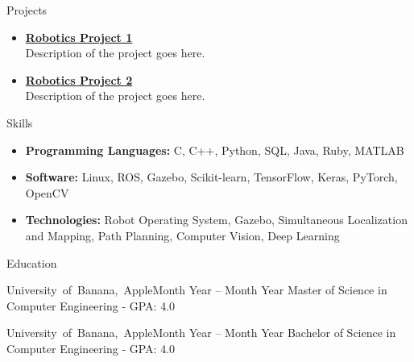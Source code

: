 \documentclass[]{mcdowellcv}
\begin{document}
\begin{cvsection}{Projects}

    \begin{cvsubsection}{}{}{}
        \begin{itemize}
            \setlength\itemsep{3pt}
            \item\textbf{\href{https://github.com/johndoe/beepboop}{Robotics Project 1}} \\
            Description of the project goes here.
        \end{itemize}
    \end{cvsubsection}
    
    \begin{cvsubsection}{}{}{}
        \begin{itemize}
            \setlength\itemsep{3pt}
            \item\textbf{\href{https://github.com/johndoe/beepboop}{Robotics Project 2}} \\
            Description of the project goes here.
        \end{itemize}
    \end{cvsubsection}
    
\end{cvsection}

\begin{cvsection}{Skills}
    \begin{cvsubsection}{}{}{}
        \begin{itemize}
            \item \textbf{Programming Languages:} C, C++, Python, SQL, Java, Ruby, MATLAB
            \item \textbf{Software:} Linux, ROS, Gazebo, Scikit-learn, TensorFlow, Keras, PyTorch, OpenCV
            \item \textbf{Technologies:} Robot Operating System, Gazebo, Simultaneous Localization and Mapping, Path Planning, Computer Vision, Deep Learning
        \end{itemize}
    \end{cvsubsection}
\end{cvsection}

\begin{cvsection}{Education}

    \begin{cvsubsection}{\mbox {University of Banana, Apple}}{}{Month Year -- Month Year}
        Master of Science in Computer Engineering - GPA: 4.0
    \end{cvsubsection}
    
    \begin{cvsubsection}{\mbox {University of Banana, Apple}}{}{Month Year -- Month Year}
        Bachelor of Science in Computer Engineering - GPA: 4.0
    \end{cvsubsection}
     
\end{cvsection}
\end{document}
